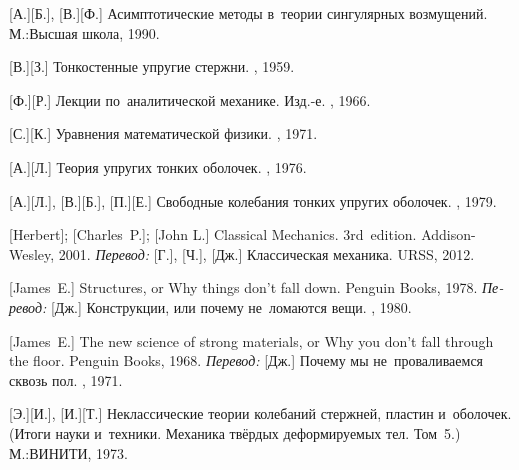 \begin{thebibliography}{123}
\begin{otherlanguage}{russian}
[А.][Б.], [В.][Ф.] Асимптотические методы в~теории сингулярных возмущений. М.:\;Высшая школа, 1990. 

[В.][З.] Тонкостенные упругие стержни. \fizmatgiz, 1959. 

[Ф.][Р.] Лекции по~аналитической механике. Изд.\hbox{-}е. \naukapublisher, 1966. 

[С.][К.] Уравнения математической физики. \naukapublisher, 1971. 

[А.][Л.] Теория упругих тонких оболочек. \naukapublisher, 1976. 

[А.][Л.], [В.][Б.], [П.][Е.] Свободные ко\-леба\-ния тонких упругих оболочек. \naukapublisher, 1979. 

%

[Herbert]; [Charles~P.]; [John L.] Classical Mechanics. 3rd~edition. Addison\hbox{-}Wesley, 2001. 
\emph{Перевод:} [Г.], [Ч.], [Дж.] Классическая механика. URSS, 2012. 

[James~E.] Structures, or Why things don’t fall down. Penguin Books, 1978. 
\emph{Перевод:} [Дж.] Конструкции, или почему не~ломаются вещи. \mirpublisher, 1980. 

[James~E.] The new science of strong materials, or Why you don’t fall through the floor. Penguin Books, 1968. 
\emph{Перевод:} [Дж.] Почему мы не~проваливаемся сквозь пол. \mirpublisher, 1971. 

[Э.][И.], [И.][Т.] Неклассические теории колебаний стержней, пластин и~оболочек. (Итоги науки и~техники. Механика твёрдых деформируемых тел. Том~5.) М.:\;ВИНИТИ, 1973. 


\end{otherlanguage}
\end{thebibliography}

